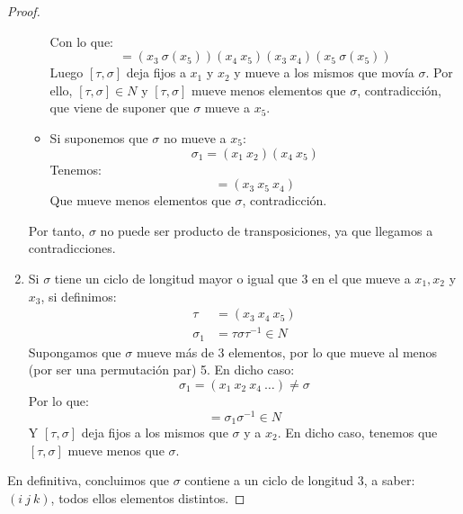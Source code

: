 \begin{teo}[de Abel]
\begin{proof}
\begin{enumerate}
\begin{itemize}
                        Con lo que:
                        \begin{equation*}
                            [\tau, \sigma] = (x_3\ \sigma(x_5))(x_4\ x_5)(x_3\ x_4)(x_5\ \sigma(x_5))
                        \end{equation*}
                        Luego $[\tau, \sigma]$ deja fijos a $x_1$ y $x_2$ y mueve a los mismos que movía $\sigma$. Por ello, $[\tau, \sigma]\in N$ y $[\tau, \sigma]$ mueve menos elementos que $\sigma$, contradicción, que viene de suponer que $\sigma$ mueve a $x_5$.
                    \item Si suponemos que $\sigma$ no mueve a $x_5$:
                        \begin{equation*}
                            \sigma_1 = (x_1\ x_2)(x_4\ x_5)
                        \end{equation*}
                        Tenemos:
                        \begin{equation*}
                            [\tau, \sigma] = (x_3\ x_5\ x_4)
                        \end{equation*}
                        Que mueve menos elementos que $\sigma$, contradicción.
                \end{itemize}
                Por tanto, $\sigma$ no puede ser producto de transposiciones, ya que llegamos a contradicciones.
            \item Si $\sigma$ tiene un ciclo de longitud mayor o igual que 3 en el que mueve a $x_1,x_2$ y $x_3$, si definimos:
                \begin{align*}
                    \tau &= (x_3\ x_4\ x_5) \\
                    \sigma_1 &= \tau \sigma \tau^{-1}  \in N
                \end{align*}
                Supongamos que $\sigma$ mueve más de 3 elementos, por lo que mueve al menos (por ser una permutación par) 5. En dicho caso:
                \begin{equation*}
                    \sigma_1 = (x_1\ x_2\ x_4\ \ldots) \neq \sigma
                \end{equation*}
                Por lo que:
                \begin{equation*}
                    [\tau, \sigma] = \sigma_1 \sigma^{-1} \in N
                \end{equation*}
                Y $[\tau, \sigma]$ deja fijos a los mismos que $\sigma$ y a $x_2$. En dicho caso, tenemos que $[\tau, \sigma]$ mueve menos que $\sigma$.
        \end{enumerate}
        En definitiva, concluimos que $\sigma$ contiene a un ciclo de longitud 3, a saber: $(i\ j\ k)$, todos ellos elementos distintos.


\end{proof}
\end{teo}
